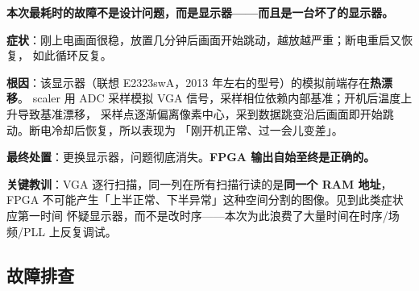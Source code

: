 \begin{warnbox}
\textbf{本次最耗时的故障不是设计问题，而是显示器——而且是一台坏了的显示器。}

\textbf{症状}：刚上电画面很稳，放置几分钟后画面开始跳动，越放越严重；断电重启又恢复，
如此循环反复。

\textbf{根因}：该显示器（联想 E2323swA，2013 年左右的型号）的模拟前端存在\textbf{热漂移}。
scaler 用 ADC 采样模拟 VGA 信号，采样相位依赖内部基准；开机后温度上升导致基准漂移，
采样点逐渐偏离像素中心，采到数据跳变沿后画面即开始跳动。断电冷却后恢复，所以表现为
「刚开机正常、过一会儿变差」。

\textbf{最终处置}：更换显示器，问题彻底消失。\textbf{FPGA 输出自始至终是正确的。}

\textbf{关键教训}：VGA 逐行扫描，同一列在所有扫描行读的是\textbf{同一个 RAM 地址}，
FPGA 不可能产生「上半正常、下半异常」这种空间分割的图像。见到此类症状应第一时间
怀疑显示器，而不是改时序——本次为此浪费了大量时间在时序/场频/PLL 上反复调试。
\end{warnbox}

\subsection{故障排查}

